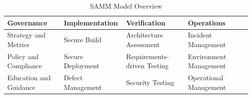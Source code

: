 \begin{table}[!h]
    \centering
    \caption{SAMM Model Overview}
    \label{tab:samm-model}
    \begin{tabulary}{1.0\textwidth}{|L|L|L|L|L|}
        \hline
        \textbf{Governance} & \textbf{Implementation} & \textbf{Verification} & \textbf{Operations} \\ 
        \hline
        Strategy and Metrics & Secure Build & Architecture Assessment & Incident Management \\
        \hline
        Policy and Compliance & Secure Deployment & Requirements-driven Testing & Environment Management \\
        \hline
        Education and Guidance & Defect Management & Security Testing & Operational Management \\
        \hline
    \end{tabulary}
\end{table}
